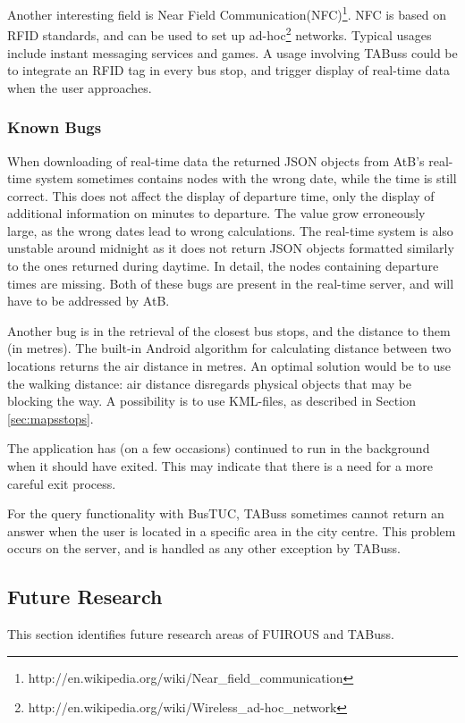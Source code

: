 Another interesting field is Near Field Communication(NFC)\footnote{http://en.wikipedia.org/wiki/Near\_field\_communication}. NFC is based on RFID standards, and can be used to set up ad-hoc\footnote{http://en.wikipedia.org/wiki/Wireless\_ad-hoc\_network} networks. Typical usages include instant messaging services and games. A usage involving TABuss could be to integrate an RFID tag in every bus stop, and trigger display of real-time data when the user approaches.


\subsubsection{Known Bugs}
When downloading of real-time data the returned JSON objects from AtB's real-time system sometimes contains nodes with the wrong date, while the time is still correct. This does not affect the display of departure time, only the display of additional information on minutes to departure. The value grow erroneously large, as the wrong dates lead to wrong calculations. The real-time system is also unstable around midnight as it does not return JSON objects formatted similarly to the ones returned during daytime. In detail, the nodes containing departure times are missing. Both of these bugs are present in the real-time server, and will have to be addressed by AtB.


Another bug is in the retrieval of the closest bus stops, and the distance to them (in metres). The built-in Android algorithm for calculating distance between two locations returns the air distance in metres. An optimal solution would be to use the walking distance: air distance disregards physical objects that may be blocking the way. A possibility is to use KML-files, as described in Section \ref{sec:mapsstops}.

The application has (on a few occasions) continued to run in the background when it should have exited. This may indicate that there is a need for a more careful exit process.

For the query functionality with BusTUC, TABuss sometimes cannot return an answer when the user is located in a specific area in the city centre. This problem occurs on the server, and is handled as any other exception by TABuss.


\subsection{Future Research}
This section identifies future research areas of FUIROUS and TABuss.
